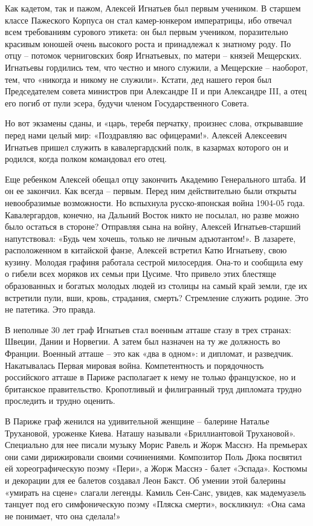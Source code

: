 Как кадетом, так и пажом, Алексей Игнатьев был первым учеником. В старшем
классе Пажеского Корпуса он стал камер-юнкером императрицы, ибо отвечал всем
требованиям сурового этикета: он был первым учеником, поразительно красивым
юношей очень высокого роста и принадлежал к знатному роду. По отцу – потомок
черниговских бояр Игнатьевых, по матери – князей Мещерских. Игнатьевы гордились
тем, что честно и много служили, а Мещерские – наоборот, тем, что «никогда и
никому не служили». Кстати, дед нашего героя был Председателем совета министров
при Александре II и при Александре III, а отец его погиб от пули эсера, будучи
членом Государственного Совета. 


Но вот экзамены сданы, и «царь, теребя перчатку, произнес слова, открывавшие
перед нами целый мир: «Поздравляю вас офицерами!». Алексей Алексеевич Игнатьев
пришел служить в кавалергардский полк, в казармах которого он и родился, когда
полком командовал его отец.  


Еще ребенком Алексей обещал отцу закончить Академию Генерального штаба. И он ее
закончил. Как всегда – первым. Перед ним действительно были открыты
невообразимые возможности. Но вспыхнула русско-японская война 1904-05 года.
Кавалергардов, конечно, на Дальний Восток никто не посылал, но разве можно было
остаться в стороне? Отправляя сына на войну, Алексей Игнатьев-старший
напутствовал: «Будь чем хочешь, только не личным адъютантом!». В лазарете,
расположенном в китайской фанзе, Алексей встретил Катю Игнатьеву, свою кузину.
Молодая графиня работала сестрой милосердия. Она-то и сообщила ему о гибели
всех моряков их семьи при Цусиме. Что привело этих блестяще образованных и
богатых молодых людей из столицы на самый край земли, где их встретили пули,
вши, кровь, страдания, смерть? Стремление служить родине. Это не патетика. Это
правда.    

В неполные 30 лет граф Игнатьев стал военным атташе стазу в трех странах:
Швеции, Дании и Норвегии. А затем был назначен на ту же должность во Франции.
Военный атташе – это как «два в одном»: и дипломат, и разведчик. Накатывалась
Первая мировая война. Компетентность и порядочность российского атташе в Париже
располагает к нему не только французское, но и британское правительство.
Кропотливый и филигранный труд дипломата трудно проследить и трудно оценить.

В Париже граф женился на удивительной женщине – балерине Наталье Трухановой,
уроженке Киева. Наташу называли «Бриллиантовой Трухановой». Специально для нее
писали музыку Морис Равель и Жорж Масснэ. На премьерах они сами дирижировали
своими сочинениями. Композитор Поль Дюка посвятил ей хореографическую поэму
«Пери», а Жорж Масснэ - балет «Эспада». Костюмы и декорации для ее балетов
создавал Леон Бакст. Об умении этой балерины «умирать на сцене» слагали
легенды. Камиль Сен-Санс, увидев, как мадемуазель танцует под его симфоническую
поэму «Пляска смерти», воскликнул: «Она сама не понимает, что она сделала!» 

